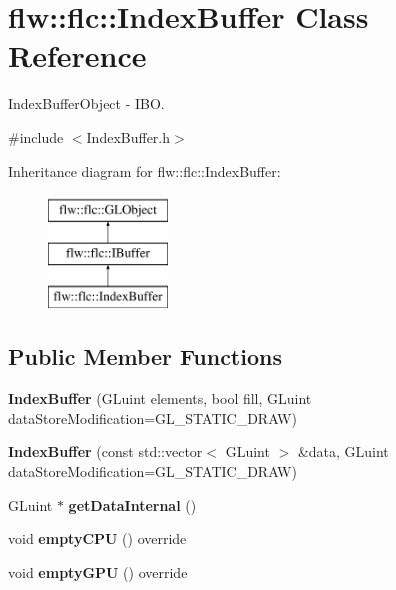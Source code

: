 \hypertarget{classflw_1_1flc_1_1IndexBuffer}{}\section{flw\+:\+:flc\+:\+:Index\+Buffer Class Reference}
\label{classflw_1_1flc_1_1IndexBuffer}


Index\+Buffer\+Object -\/ I\+BO.  




{\ttfamily \#include $<$Index\+Buffer.\+h$>$}

Inheritance diagram for flw\+:\+:flc\+:\+:Index\+Buffer\+:\begin{figure}[H]
\begin{center}
\leavevmode
\includegraphics[height=3.000000cm]{classflw_1_1flc_1_1IndexBuffer}
\end{center}
\end{figure}
\subsection*{Public Member Functions}
\begin{DoxyCompactItemize}
\item 
\mbox{\label{classflw_1_1flc_1_1IndexBuffer_a47991f0d3db10cfd1f946635e1a45aad}} 
{\bfseries Index\+Buffer} (G\+Luint elements, bool fill, G\+Luint data\+Store\+Modification=G\+L\+\_\+\+S\+T\+A\+T\+I\+C\+\_\+\+D\+R\+AW)
\item 
\mbox{\label{classflw_1_1flc_1_1IndexBuffer_a7bc7c0154f66f622e702830a1c005092}} 
{\bfseries Index\+Buffer} (const std\+::vector$<$ G\+Luint $>$ \&data, G\+Luint data\+Store\+Modification=G\+L\+\_\+\+S\+T\+A\+T\+I\+C\+\_\+\+D\+R\+AW)
\item 
\mbox{\label{classflw_1_1flc_1_1IndexBuffer_a9f5a8ec45b5f93f76eba01922cd76c90}} 
G\+Luint $\ast$ {\bfseries get\+Data\+Internal} ()
\item 
\mbox{\label{classflw_1_1flc_1_1IndexBuffer_a7dfedbdadc1a813955a25f1000f6c8c3}} 
void {\bfseries empty\+C\+PU} () override
\item 
\mbox{\label{classflw_1_1flc_1_1IndexBuffer_a88230425f7e4391a216acf45ffb2e1d0}} 
void {\bfseries empty\+G\+PU} () override
\end{DoxyCompactItemize}
